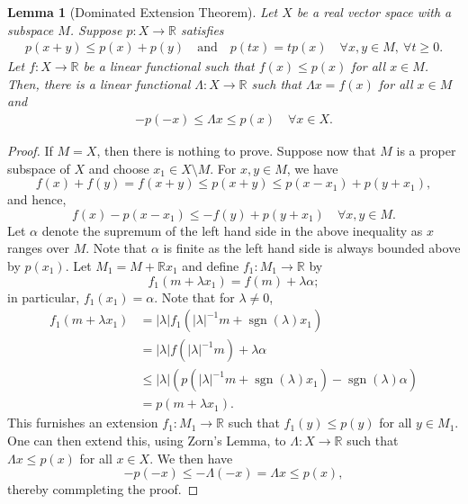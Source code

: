 \documentclass[11pt]{article}
\theoremstyle{thmstyle}
\newtheorem{lemma}[theorem]{Lemma}
\theoremstyle{defstyle}
\newcommand{\R}{\mathbb{R}}
\newcommand{\sgn}{\operatorname{sgn}}
\renewcommand{\le}{\leqslant}
\renewcommand{\ge}{\geqslant}
\begin{document}
\begin{lemma}[Dominated Extension Theorem]
    Let $X$ be a real vector space with a subspace $M$. Suppose $p: X\to\R$ satisfies
    \begin{align*}
        p(x + y)\le p(x) + p(y)\quad\text{and}\quad p(tx) = tp(x)\quad\forall x,y\in M,~\forall t\ge 0.
    \end{align*}
    Let $f: X\to\R$ be a linear functional such that $f(x)\le p(x)$ for all $x\in M$. Then, there is a linear functional $\Lambda: X\to\R$ such that $\Lambda x = f(x)$ for all $x\in M$ and 
    \begin{align*}
        -p(-x)\le \Lambda x\le p(x)\quad\forall x\in X.
    \end{align*}
\end{lemma}
\begin{proof}
    If $M = X$, then there is nothing to prove. Suppose now that $M$ is a proper subspace of $X$ and choose $x_1\in X\setminus M$. For $x,y\in M$, we have 
    \begin{equation*}
        f(x) + f(y) = f(x + y)\le p(x + y)\le p(x - x_1) + p(y + x_1),
    \end{equation*}
    and hence, 
    \begin{equation*}
        f(x) - p(x - x_1)\le -f(y) + p(y + x_1)\quad\forall x,y\in M.
    \end{equation*}
    Let $\alpha$ denote the supremum of the left hand side in the above inequality as $x$ ranges over $M$. Note that $\alpha$ is finite as the left hand side is always bounded above by $p(x_1)$. Let $M_1 = M + \R x_1$ and define $f_1: M_1\to\R$ by 
    \begin{equation*}
        f_1(m + \lambda x_1) = f(m) + \lambda\alpha;
    \end{equation*}
    in particular, $f_1(x_1) = \alpha$. Note that for $\lambda\ne 0$,
    \begin{align*}
        f_1(m + \lambda x_1) &= |\lambda| f_1(|\lambda|^{-1}m + \sgn(\lambda) x_1)\\
        &= |\lambda|f(|\lambda|^{-1}m) + \lambda\alpha\\
        &\le|\lambda|\left(p(|\lambda|^{-1}m + \sgn(\lambda) x_1) - \sgn(\lambda)\alpha\right)\\
        &= p(m + \lambda x_1).
    \end{align*}
    This furnishes an extension $f_1: M_1\to\R$ such that $f_1(y)\le p(y)$ for all $y\in M_1$. One can then extend this, using Zorn's Lemma, to $\Lambda: X\to\R$ such that $\Lambda x\le p(x)$ for all $x\in X$. We then have 
    \begin{equation*}
        -p(-x)\le -\Lambda(-x) = \Lambda x\le p(x),
    \end{equation*}
    thereby commpleting the proof.
\end{proof}
\end{document}
